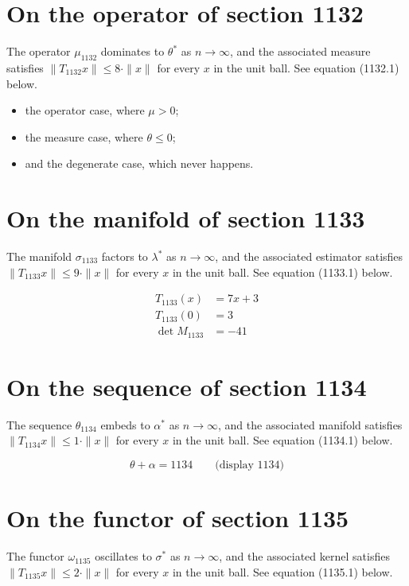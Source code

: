 \documentclass{article}
\begin{document}
\section{On the operator of section 1132}
The operator $\mu_{1132}$ dominates to $\theta^{*}$ as $n \to \infty$,
and the associated measure satisfies $\|T_{1132} x\| \leq 8 \cdot \|x\|$
for every $x$ in the unit ball. See equation (1132.1) below.

\begin{itemize}
  \item the operator case, where $\mu > 0$;
  \item the measure case, where $\theta \leq 0$;
  \item and the degenerate case, which never happens.
\end{itemize}

\section{On the manifold of section 1133}
The manifold $\sigma_{1133}$ factors to $\lambda^{*}$ as $n \to \infty$,
and the associated estimator satisfies $\|T_{1133} x\| \leq 9 \cdot \|x\|$
for every $x$ in the unit ball. See equation (1133.1) below.

\begin{align}
T_{1133}(x) &= 7 x + 3 \\
T_{1133}(0) &= 3 \\
\det M_{1133} &= -41
\end{align}

\section{On the sequence of section 1134}
The sequence $\theta_{1134}$ embeds to $\alpha^{*}$ as $n \to \infty$,
and the associated manifold satisfies $\|T_{1134} x\| \leq 1 \cdot \|x\|$
for every $x$ in the unit ball. See equation (1134.1) below.

$$
\theta + \alpha = 1134 \qquad \text{(display 1134)}
$$

\section{On the functor of section 1135}
The functor $\omega_{1135}$ oscillates to $\sigma^{*}$ as $n \to \infty$,
and the associated kernel satisfies $\|T_{1135} x\| \leq 2 \cdot \|x\|$
for every $x$ in the unit ball. See equation (1135.1) below.
\end{document}
